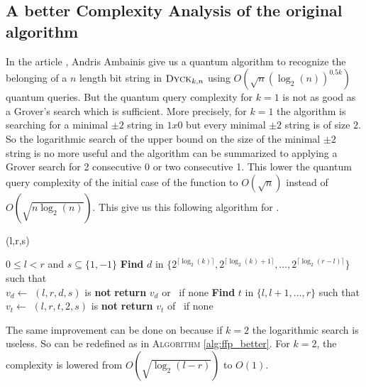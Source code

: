 \subsection{A better Complexity Analysis of the original algorithm}

In the article \cite{art:2DGrid}, Andris Ambainis give us a quantum algorithm to recognize
the belonging of a $n$ length bit string in $\textsc{Dyck$_{k, n}$}$ using
$O(\sqrt{n}(\log_2(n))^{0.5k})$ quantum queries. But the quantum query complexity for $k=1$ is not as good as a
Grover's search which is sufficient. More precisely, for $k=1$ the algorithm is
searching for a minimal $\pm 2$ string in $1x0$ but every minimal $\pm 2$ string
is of size $2$. So the logarithmic search of the upper bound on the size of the
minimal $\pm 2$ string is no more useful and the algorithm can be summarized to
applying a Grover search for 2 consecutive 0 or two consecutive 1. This lower the quantum
query complexity of the initial case of the function to $O(\sqrt{n})$ instead of $O(\sqrt{n\log_2(n)})$.
This give us this following algorithm for .

\begin{algorithm}
    \caption{(l,r,s)}\label{alg:FA_prim}
    \begin{algorithmic}
        \Require $0 \leq l < r$ and $s \subseteq \{1,-1\}$
        \State \textbf{Find} $d$ in $\{2^{\lceil \log_2(k)\rceil }, 2^{\lceil \log_2(k)+1\rceil },\ldots,2^{\lceil \log_2(r-l)\rceil }\}$
        such that \\
        \hspace*{1cm} $v_d \gets $ $(l,r,d,s)$ is \textbf{not} \Null
        \State \textbf{return} $v_d$ or \Null \ if none
        \Else
        \State \textbf{Find} $t$ in $\{l, l+1, \dots, r\}$ such that \\
        \hspace*{1cm} $v_t \gets$ $(l,r,t,2,s)$ is \textbf{not} \Null
        \State \textbf{return} $v_t$ of \Null \ if none
        \EndIf
    \end{algorithmic}
\end{algorithm}

The same improvement can be done on  because if $k = 2$ the logarithmic
search is useless. So  can be redefined as in \textsc{Algorithm} \autoref{alg:ffp_better}.
For $k=2$, the complexity is lowered from $O(\sqrt{\log_2(l-r)})$ to $O(1)$.

